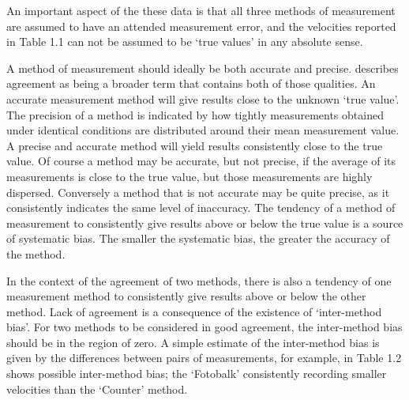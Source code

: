 \documentclass[12pt, a4paper]{report}
\theoremstyle{plain}
\theoremstyle{definition}
\theoremstyle{remark}
\begin{document}
	An important aspect of the these data is that all three methods of
	measurement are assumed to have an attended measurement error, and
	the velocities reported in Table 1.1 can not be assumed to be
	`true values' in any absolute sense.
	
	
	A method of measurement should ideally be both accurate and
	precise. \citet{Barnhart} describes agreement as being a broader
	term that contains both of those qualities. An accurate
	measurement method will give results close to the unknown `true
	value'. The precision of a method is indicated by how tightly
	measurements obtained under identical conditions are distributed
	around their mean measurement value. A precise and accurate method
	will yield results consistently close to the true value. Of course
	a method may be accurate, but not precise, if the average of its
	measurements is close to the true value, but those measurements
	are highly dispersed. Conversely a method that is not accurate may
	be quite precise, as it consistently indicates the same level of
	inaccuracy. The tendency of a method of measurement to
	consistently give results above or below the true value is a
	source of systematic bias. The smaller the systematic bias, the
	greater the accuracy of the method.
	
	
	In the context of the agreement of two methods, there is also a
	tendency of one measurement method to consistently give results
	above or below the other method. Lack of agreement is a
	consequence of the existence of `inter-method bias'. For two
	methods to be considered in good agreement, the inter-method bias
	should be in the region of zero. A simple estimate of the
	inter-method bias is given by the differences between pairs of measurements, for example, in Table 1.2 shows possible inter-method bias; the `Fotobalk' consistently recording
	smaller velocities than the `Counter' method. 
	
\end{document}
